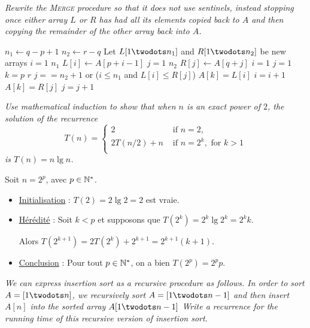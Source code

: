 \begin{description}
\begin{ex}
    \end{ex}

   {\itshape Rewrite the \textsc{Merge} procedure so that it does not use sentinels, instead stopping once either array $L$ or $R$ has had all its elements copied back to $A$ and then copying the remainder of the other array back into $A$.}

    \begin{ex}
      \begin{codebox}
        \li $n_1 \gets q - p + 1$
        \li $n_2 \gets r - q$
        \li Let $L[1\twodots n_1]$ and $R[1\twodots n_2]$ be new arrays
        \li \For $i = 1$ \To $n_1$ \Do
        \li $L[i] \gets A[p + i -1]$ \End
        \li \For $j = 1$ \To $n_2$ \Do
        \li $R[j] \gets A[q + j]$ \End
        \li $i = 1$
        \li $j = 1$
        \li \For $k = p$ \To $r$ \Do
        \li \If $ j == n_2+1$ or  ($i \le n_1$ and $L[i] \le R[j]$) \Then
        \li $A[k] = L[i]$
        \li $i = i+1$
        \li \Else 
        \li $A[k] = R[j]$
        \li $j = j+1$\End \End
      \end{codebox}
    \end{ex}

   {\itshape Use mathematical induction to show that when $n$ is an exact power of $2$, the solution of the recurrence 
    \[T(n) = \left\{
      \begin{array}{ll}
        2 & \text{ if } n = 2,\\
        2T(n/2)+n & \text{ if }n = 2^k, \text{ for } k> 1\\
      \end{array}
    \right.\]
  is $T(n) = n\lg n$.}

    \begin{ex}
      Soit $n = 2^p$, avec $p \in \mathbb{N}^*$.
      \begin{itemize}
        \item \ul{Initialisation} : $T(2) = 2\lg 2 = 2$ est vraie.
        \item \ul{H\'er\'edit\'e} : Soit $k < p$ et supposons que $T(2^k) = 2^k\lg 2^k = 2^kk$.

          Alors $T(2^{k+1}) = 2T(2^k)+2^{k+1} = 2^{k+1}(k+1)$.
        \item \ul{Conclusion} : Pour tout $p \in \mathbb{N}^*$, on a bien $T(2^p) = 2^p p$.
      \end{itemize}
    \end{ex}

   {\itshape We can express insertion sort as a recursive procedure as follows. In order to sort ${ A = [1 \twodots n]}$, we recursively sort $A = [1 \twodots n-1]$ and then insert $A[n]$ into the sorted array ${A[1 \twodots n-1]}$ Write a recurrence for the running time of this recursive version of
insertion sort.}


\end{description}

